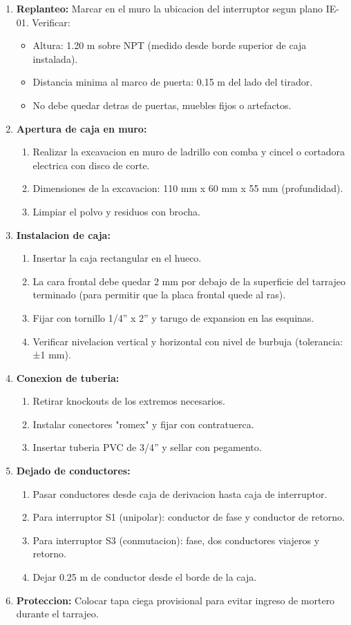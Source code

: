 \begin{enumerate}
  \item \textbf{Replanteo:} Marcar en el muro la ubicacion del interruptor segun plano IE-01. Verificar:
  \begin{itemize}
    \item Altura: 1.20 m sobre NPT (medido desde borde superior de caja instalada).
    \item Distancia minima al marco de puerta: 0.15 m del lado del tirador.
    \item No debe quedar detras de puertas, muebles fijos o artefactos.
  \end{itemize}
  \item \textbf{Apertura de caja en muro:}
  \begin{enumerate}
    \item Realizar la excavacion en muro de ladrillo con comba y cincel o cortadora electrica con disco de corte.
    \item Dimensiones de la excavacion: 110 mm x 60 mm x 55 mm (profundidad).
    \item Limpiar el polvo y residuos con brocha.
  \end{enumerate}
  \item \textbf{Instalacion de caja:}
  \begin{enumerate}
    \item Insertar la caja rectangular en el hueco.
    \item La cara frontal debe quedar 2 mm por debajo de la superficie del tarrajeo terminado (para permitir que la placa frontal quede al ras).
    \item Fijar con tornillo 1/4'' x 2'' y tarugo de expansion en las esquinas.
    \item Verificar nivelacion vertical y horizontal con nivel de burbuja (tolerancia: ±1 mm).
  \end{enumerate}
  \item \textbf{Conexion de tuberia:}
  \begin{enumerate}
    \item Retirar knockouts de los extremos necesarios.
    \item Instalar conectores "romex" y fijar con contratuerca.
    \item Insertar tuberia PVC de 3/4'' y sellar con pegamento.
  \end{enumerate}
  \item \textbf{Dejado de conductores:}
  \begin{enumerate}
    \item Pasar conductores desde caja de derivacion hasta caja de interruptor.
    \item Para interruptor S1 (unipolar): conductor de fase y conductor de retorno.
    \item Para interruptor S3 (conmutacion): fase, dos conductores viajeros y retorno.
    \item Dejar 0.25 m de conductor desde el borde de la caja.
  \end{enumerate}
  \item \textbf{Proteccion:} Colocar tapa ciega provisional para evitar ingreso de mortero durante el tarrajeo.
\end{enumerate}

